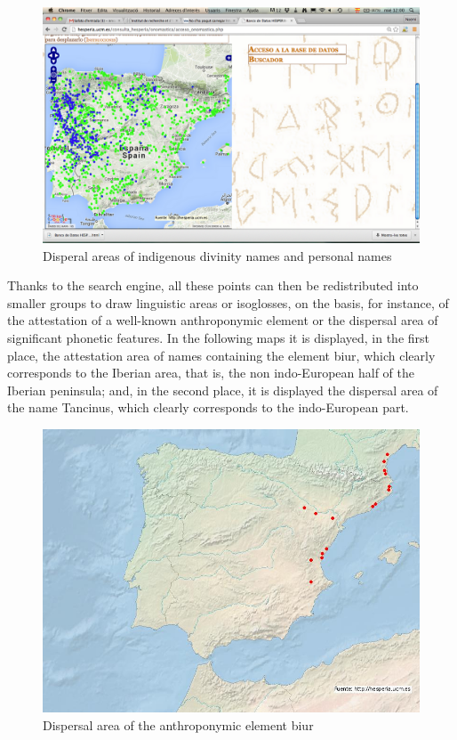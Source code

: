 \documentclass[amsthm,ebook]{saparticle}
\begin{document}
\begin{figure}[!bp]
\centering
 \includegraphics[width=\columnwidth]{EpigraphyandonomasticsinHesperiadatabanktemplate-img007.png}
\caption{Disperal areas of indigenous divinity names and personal names}
\label{fig:7}
\end{figure}
 

Thanks to the search engine, all these points can then be redistributed into smaller groups to draw linguistic areas or
isoglosses, on the basis, for instance, of the attestation of a well-known anthroponymic element or the dispersal area
of significant phonetic features. In the following maps it is displayed, in the first place, the attestation area of
names containing the element biur, which clearly corresponds to the Iberian area, that is, the non indo-European half
of the Iberian peninsula; and, in the second place, it is displayed the dispersal area of the name Tancinus, which
clearly corresponds to the indo-European part.

\begin{figure}[!bp]
\centering
 \includegraphics[width=\columnwidth]{EpigraphyandonomasticsinHesperiadatabanktemplate-img008.jpg}
\caption{Dispersal area of the anthroponymic element biur}
\label{fig:}
\end{figure}
\end{document}
